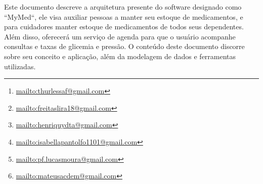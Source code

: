 \documentclass[
	article,			%
	12pt,				%
	oneside,			%
	a4paper,			%
    BIBLATEX,           %
	english,			%
	brazil,				%
	sumario=tradicional
	]{abntex2}
\title{\nomeprojeto}
\author{
Arthur Augusto Lessa Ferreira\inst{1}\thanks{\url{mailto:thurlessaf@gmail.com}}, 
Fernando Freitas de Lira\inst{1}\thanks{\url{mailto:freitaslira18@gmail.com}},
Henriquy Dias Terto Alves\inst{1}\thanks{\url{mailto:henriquydta@gmail.com}},
\\ Isabella Pantolfo Melo\inst{1}\thanks{\url{mailto:isabellapantolfo1101@gmail.com}}, 
\\ Lucas da Conceição Silva Moura\inst{1}\thanks{\url{mailto:pf.lucasmoura@gmail.com}},
\\ Mateus Armando Carrara de Mendonça\inst{1}\thanks{\url{mailto:mateusacdem@gmail.com} }}
\newcommand\nomeprojeto{MyMed}
\begin{document}


\frenchspacing 


%
%

\maketitle


\begin{abstract}
    This document describes the current architecture of the software designated as ``\nomeprojeto``, which aims to help people maintain their medication supply; and for caregivers maintain medication supplies for all their dependents. In addition, it will offer a scheduling service so that the user can track appointments and blood glucose and blood pressure levels. The content of this document discusses its concept and application, in addition to the data modeling and tools used.
\end{abstract}
     
\begin{resumo1} 
  Este documento descreve a arquitetura presente do software designado como ``\nomeprojeto``, ele visa auxiliar pessoas a manter seu estoque de medicamentos, e para cuidadores manter estoque de medicamentos de todos seus dependentes. Além disso, oferecerá um serviço de agenda para que o usuário acompanhe consultas e taxas de glicemia e pressão. O conteúdo deste documento discorre sobre seu conceito e aplicação, além da modelagem de dados e ferramentas utilizadas.
\end{resumo1}




\end{document}
